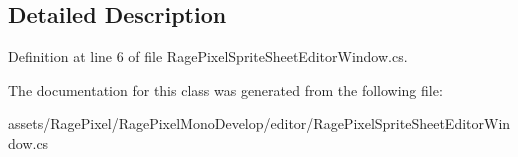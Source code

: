 \subsection{Detailed Description}


Definition at line 6 of file Rage\-Pixel\-Sprite\-Sheet\-Editor\-Window.\-cs.



The documentation for this class was generated from the following file\-:\begin{DoxyCompactItemize}
\item 
assets/\-Rage\-Pixel/\-Rage\-Pixel\-Mono\-Develop/editor/Rage\-Pixel\-Sprite\-Sheet\-Editor\-Window.\-cs\end{DoxyCompactItemize}
